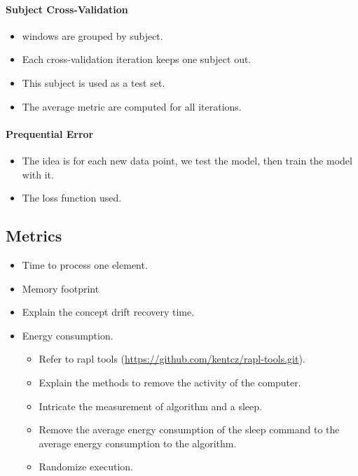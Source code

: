\paragraph{Subject Cross-Validation~\cite{subject_cross_validation}}
\begin{itemize}
	\item windows are grouped by subject.
	\item Each cross-validation iteration keeps one subject out.
	\item This subject is used as a test set.
	\item The average metric are computed for all iterations.
\end{itemize}

\paragraph{Prequential Error~\cite{issues_learning_from_stream}}
\begin{itemize}
	\item The idea is for each new data point, we test the model, then train the model with it.
	\item The loss function used.
\end{itemize}


\subsection{Metrics}
\begin{itemize}
	\item Time to process one element.
	\item Memory footprint
	\item Explain the concept drift recovery time.
	\item Energy consumption.
	\begin{itemize}
		\item Refer to rapl tools (\url{https://github.com/kentcz/rapl-tools.git}).
		\item Explain the methods to remove the activity of the computer.
		\item Intricate the measurement of algorithm and a sleep.
		\item Remove the average energy consumption of the sleep command to the average energy consumption to the algorithm.
		\item Randomize execution.
	\end{itemize}
\end{itemize}

